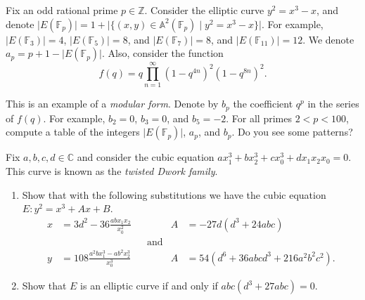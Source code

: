 \documentclass[12 pt, letterpaper]{hmcpset}
\begin{document}
\begin{problem}[Problem 1.]
	Fix an odd rational prime $p \in \mathbb{Z}$. Consider the elliptic curve $y^{2} = x^{3} - x$, and denote $\lvert E(\mathbb{F}_{p}) \rvert = 1 + \lvert \{ (x, y) \in \mathbb{A}^{2}(\mathbb{F}_{p}) \mid y^{2} = x^{3} - x \} \rvert$. For example, $\lvert E(\mathbb{F}_{3}) \rvert = 4$, $\lvert E(\mathbb{F}_{5}) \rvert = 8$, and $\lvert E(\mathbb{F}_{7}) \rvert = 8$, and $\lvert E(\mathbb{F}_{11}) \rvert = 12$. We denote $a_{p} = p + 1 - \lvert E(\mathbb{F}_{p}) \rvert$. Also, consider the function
	\[
		f(q) = q \prod_{n = 1}^{\infty} (1 - q^{4n})^{2} (1 - q^{8n})^{2}.
	\]

	This is an example of a \emph{modular form}. Denote by $b_{p}$ the coefficient $q^{p}$ in the series of $f(q)$. For example, $b_{2} = 0$, $b_{3} = 0$, and $b_{5} = -2$. For all primes $2 < p < 100$, compute a table of the integers $\lvert E(\mathbb{F}_{p}) \rvert$, $a_{p}$, and $b_{p}$. Do you see some patterns?
\end{problem}

\pagebreak

\begin{problem}[Problem 2.]
	Fix $a, b, c, d \in \mathbb{C}$ and consider the cubic equation $a x_{1}^{3} + b x_{2}^{3} + c x_{0}^{3} + d x_{1} x_{2} x_{0} = 0$. This curve is known as the \emph{twisted Dwork family}.
	\begin{enumerate}
		\item Show that with the following substitutions we have the cubic equation $E : y^{2} = x^{3} + A x + B$.
			\begin{align*}
				x & = 3 d^{2} - 36 \frac{a b x_{1} x_{2}}{x_{0}^{2}} & & & A & = -27 d(d^{3} + 24 a b c) \\
				  & & & \text{and} \\
				y & = 108 \frac{a^{2} b x_{1}^{3} - a b^{2} x_{2}^{3}}{x_{0}^{3}} & & & A & = 54 (d^{6} + 36 a b c d^{3} + 216 a^{2} b^{2} c^{2}).
			\end{align*}
		\item Show that $E$ is an elliptic curve if and only if $a b c(d^{3} + 27 a b c) = 0$.
	\end{enumerate}
\end{problem}

\pagebreak
\end{document}
